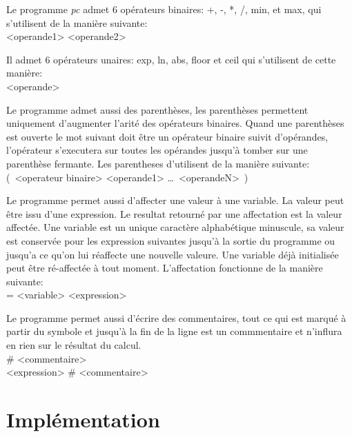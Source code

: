 \documentclass[a4paper,11pt,DIV=11]{scrartcl}
\begin{document}
\begin{onehalfspace}
    Le programme \emph{pc} admet 6 opérateurs binaires: +, -, *, /, min, et max, qui s'utilisent de
    la manière suivante:\\
    { <operande1> <operande2>\\}

    Il admet 6 opérateurs unaires: exp, ln, abs, floor et ceil qui s'utilisent de cette manière:\\
    { <operande>\\}

    Le programme admet aussi des parenthèses, les parenthèses permettent uniquement d'augmenter
    l'arité des opérateurs binaires. Quand une parenthèses est ouverte le mot suivant doit être un
    opérateur binaire suivit d'opérandes, l'opérateur s'executera sur toutes les
    opérandes jusqu'à tomber sur une parenthèse fermante. Les parentheses d'utilisent de la
    manière suivante:\\
    {\selectfont ( <operateur binaire> <operande1> \ldots <operandeN> )\\}

    Le programme permet aussi d'affecter une valeur à une variable. La valeur peut être issu d'une
    expression. Le resultat retourné par une affectation est la valeur affectée. Une variable est
    un unique caractère alphabétique minuscule, sa valeur est conservée pour les expression suivantes
    jusqu'à la sortie du programme ou jusqu'a ce qu'on lui réaffecte une nouvelle valeure. Une variable
    déjà initialisée peut être ré-affectée à tout moment. L'affectation fonctionne de la manière
    suivante:\\
    {\selectfont = <variable> <expression>\\}

    Le programme permet aussi d'écrire des commentaires, tout ce qui est marqué à partir du symbole
    \say{\#} et jusqu'à la fin de la ligne est un commmentaire et n'influra en rien sur le résultat
    du calcul.\\
    {\selectfont \# <commentaire>\\
    <expression> \# <commentaire>\\}


    \section*{Implémentation}



\end{onehalfspace}
\end{document}

